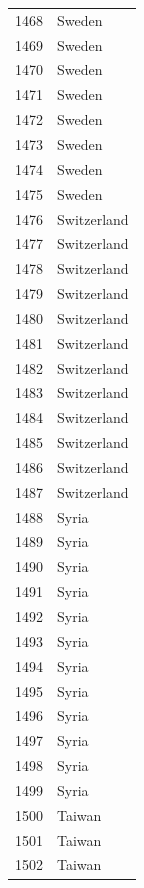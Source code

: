 \documentclass[
  letterpaper,
  DIV=11,
  numbers=noendperiod]{scrreprt}
\begin{document}
\begin{tabular}{ll}
1468 &                    Sweden \\
1469 &                    Sweden \\
1470 &                    Sweden \\
1471 &                    Sweden \\
1472 &                    Sweden \\
1473 &                    Sweden \\
1474 &                    Sweden \\
1475 &                    Sweden \\
1476 &               Switzerland \\
1477 &               Switzerland \\
1478 &               Switzerland \\
1479 &               Switzerland \\
1480 &               Switzerland \\
1481 &               Switzerland \\
1482 &               Switzerland \\
1483 &               Switzerland \\
1484 &               Switzerland \\
1485 &               Switzerland \\
1486 &               Switzerland \\
1487 &               Switzerland \\
1488 &                     Syria \\
1489 &                     Syria \\
1490 &                     Syria \\
1491 &                     Syria \\
1492 &                     Syria \\
1493 &                     Syria \\
1494 &                     Syria \\
1495 &                     Syria \\
1496 &                     Syria \\
1497 &                     Syria \\
1498 &                     Syria \\
1499 &                     Syria \\
1500 &                    Taiwan \\
1501 &                    Taiwan \\
1502 &                    Taiwan \\

\end{tabular}
\end{document}
